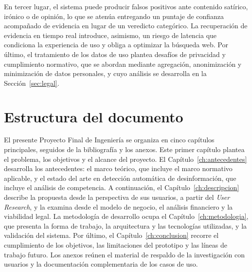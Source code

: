 En tercer lugar, el sistema puede producir falsos positivos ante contenido satírico, irónico o de opinión, lo que se atenúa entregando un puntaje de confianza acompañado de evidencia en lugar de un veredicto categórico. La recuperación de evidencia en tiempo real introduce, asimismo, un riesgo de latencia que condiciona la experiencia de uso y obliga a optimizar la búsqueda web. Por último, el tratamiento de los datos de uso plantea desafíos de privacidad y cumplimiento normativo, que se abordan mediante agregación, anonimización y minimización de datos personales, y cuyo análisis se desarrolla en la Sección~\ref{sec:legal}.

\section{Estructura del documento}
\label{sec:estructura-documento}

El presente Proyecto Final de Ingeniería se organiza en cinco capítulos principales, seguidos de la bibliografía y los anexos. Este primer capítulo plantea el problema, los objetivos y el alcance del proyecto. El Capítulo~\ref{ch:antecedentes} desarrolla los antecedentes: el marco teórico, que incluye el marco normativo aplicable, y el estado del arte en detección automática de desinformación, que incluye el análisis de competencia. A continuación, el Capítulo~\ref{ch:descripcion} describe la propuesta desde la perspectiva de sus usuarios, a partir del \textit{User Research}, y la examina desde el modelo de negocio, el análisis financiero y la viabilidad legal. La metodología de desarrollo ocupa el Capítulo~\ref{ch:metodologia}, que presenta la forma de trabajo, la arquitectura y las tecnologías utilizadas, y la validación del sistema. Por último, el Capítulo~\ref{ch:conclusion} recorre el cumplimiento de los objetivos, las limitaciones del prototipo y las líneas de trabajo futuro. Los anexos reúnen el material de respaldo de la investigación con usuarios y la documentación complementaria de los casos de uso.
